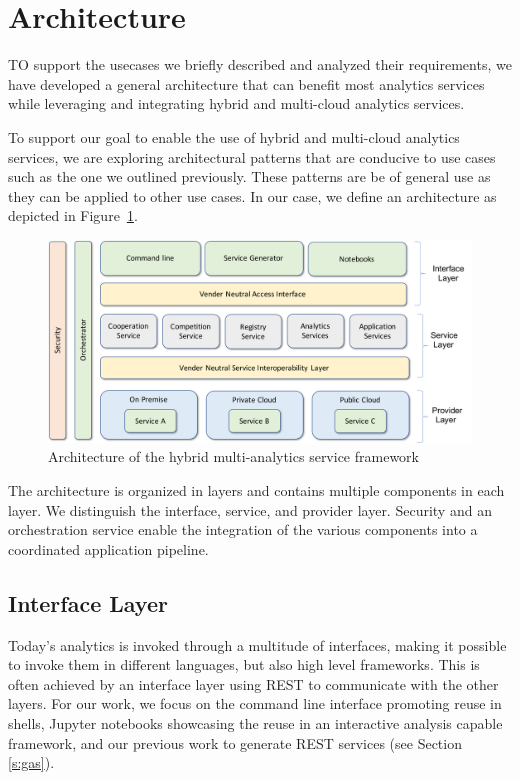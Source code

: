 
\section{Architecture}

TO support the usecases we briefly described and analyzed their requirements, 
we have developed a general architecture that can benefit most analytics services while leveraging and integrating hybrid and multi-cloud  analytics services.

To support our goal to enable the use of hybrid and multi-cloud analytics
services, we are exploring architectural patterns
that are conducive to use cases such as the one we outlined
previously. These patterns are be of general use as they can
be applied to other use cases. In our case, we define an
architecture as depicted in Figure~\ref{fig:arch}.

\begin{figure}[htb]
  \begin{center}
    \includegraphics[width=1.0\columnwidth]{images/hybrid-service-arch.pdf}
    \end{center}
  \caption {Architecture of the hybrid multi-analytics service
    framework}
  \label{fig:arch}
\end{figure}

The architecture is organized in layers  and contains
multiple components in each layer. We distinguish the interface,
service, and provider layer. Security and an orchestration service
enable the integration of the various components into a coordinated
application pipeline.

\subsection{Interface Layer}

Today's analytics is invoked through a multitude of interfaces, making
it possible to invoke them in different languages, but also high level
frameworks. This is often achieved by an interface layer using REST
to communicate with the other layers. For our work, we focus on
the command line interface promoting reuse in shells, Jupyter notebooks
showcasing the reuse in an interactive analysis capable framework, and
our previous work to generate REST services (see Section \ref{s:gas}).

